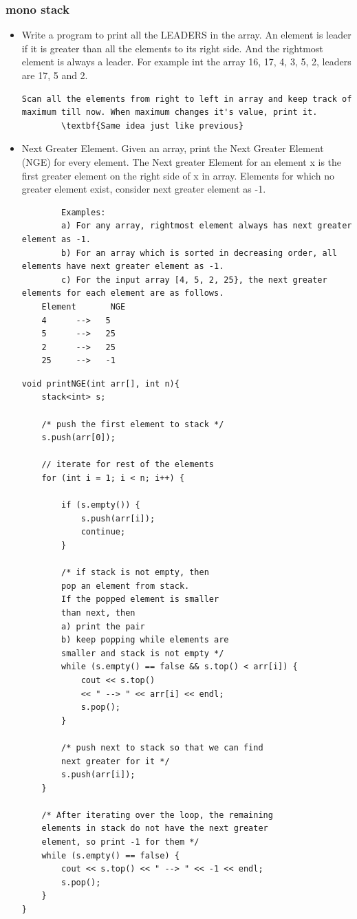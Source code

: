 \documentclass[a4paper,11pt,twoside]{book}
\begin{document}
\subsubsection{mono stack}
\begin{itemize}
	
	\item  Write a program to print all the LEADERS in the array. An element is leader if it is greater than all the elements to its right side. And the rightmost element is always a leader. For example int the array {16, 17, 4, 3, 5, 2}, leaders are 17, 5 and 2. 
	
\begin{lstlisting}[breaklines]
		Scan all the elements from right to left in array and keep track of maximum till now. When maximum changes it's value, print it.
		\textbf{Same idea just like previous}
\end{lstlisting}	
	
	\item Next Greater Element.  Given an array, print the Next Greater Element (NGE) for every element. The Next greater Element for an element x is the first greater element on the right side of x in array. Elements for which no greater element exist, consider next greater element as -1.
\begin{verbatim}
		Examples:
		a) For any array, rightmost element always has next greater element as -1.
		b) For an array which is sorted in decreasing order, all elements have next greater element as -1.
		c) For the input array [4, 5, 2, 25}, the next greater elements for each element are as follows.
	Element       NGE
	4      -->   5
	5      -->   25
	2      -->   25
	25     -->   -1
\end{verbatim}

\begin{lstlisting}[breaklines]
void printNGE(int arr[], int n){
	stack<int> s;
	
	/* push the first element to stack */
	s.push(arr[0]);

	// iterate for rest of the elements
	for (int i = 1; i < n; i++) {
		
		if (s.empty()) {
			s.push(arr[i]);
			continue;
		}
		
		/* if stack is not empty, then
		pop an element from stack.
		If the popped element is smaller
		than next, then
		a) print the pair
		b) keep popping while elements are
		smaller and stack is not empty */
		while (s.empty() == false && s.top() < arr[i]) {
			cout << s.top() 
			<< " --> " << arr[i] << endl;
			s.pop();
		}
		
		/* push next to stack so that we can find
		next greater for it */
		s.push(arr[i]);
	}
	
	/* After iterating over the loop, the remaining
	elements in stack do not have the next greater
	element, so print -1 for them */
	while (s.empty() == false) {
		cout << s.top() << " --> " << -1 << endl;
		s.pop();
	}
}
\end{lstlisting}	

\end{itemize}	
\end{document}
